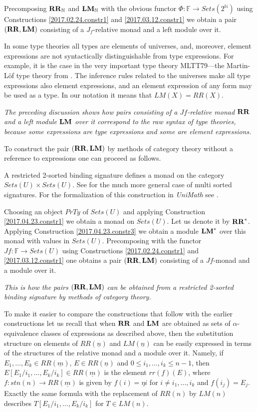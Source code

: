 \documentclass[12pt]{amsart}
\numberwithin{proposition}{subsection}
\newcommand{\sr}{\rightarrow}
\newcommand{\nn}{{\mathbb N}}
\newcommand{\nat}{\nn}
\newcommand{\uu}{\underline}
\newcommand{\RR}{{\bf RR}}
\newcommand{\LM}{{\bf LM}}
\newcommand{\FF}{{\mathbb F}}
\newcommand{\ff}[1]{\uu{#1}}
\begin{document}
Precomposing $\RR_{\nat}$ and $\LM_{\nat}$ with the obvious functor
$\Phi:\FF\sr Sets(2^{\nat})$ using Constructions \ref{2017.02.24.constr1} and
\ref{2017.03.12.constr1} we obtain a pair $(\RR,\LM)$ consisting of a $J_f$-relative monad
and a left module over it.

In some type theories all types are elements of universes, and, moreover, element
expressions are not syntactically distinguishable from type expressions. For
example, it is the case in the very important type theory MLTT79---the
Martin-L\"{o}f type theory from \cite{MLTT79}. The inference rules related to
the universes \cite[p.~172]{MLTT79} make all type expressions also element
expressions, and an element expression of any form may be used as a type. In our
notation it means that $LM(X)=RR(X)$.

{\em The preceding discussion shows how pairs consisting of a $Jf$-relative monad $\RR$
  and a left module $\LM$ over it correspond to the raw syntax of type theories,
  because some expressions are type expressions and some are element
  expressions.}

To construct the pair $(\RR,\LM)$ by methods of category theory without a
reference to expressions one can proceed as follows.

A restricted 2-sorted binding signature defines a monad on the category
$Sets(U)\times Sets(U)$. See \cite{Zsido} for the much more general case of multi
sorted signatures. For the formalization of this construction in {\em UniMath} see
\cite{AMM2017}.

Choosing an object $PrTy$ of $Sets(U)$ and applying Construction
\ref{2017.04.23.constr1} we obtain a monad on $Sets(U)$. Let us denote it by
$\RR^*$. Applying Construction \ref{2017.04.23.constr3} we obtain a module
$\LM^*$ over this monad with values in $Sets(U)$.  Precomposing with the
functor $Jf:\FF\sr Sets(U)$ using Constructions \ref{2017.02.24.constr1} and
\ref{2017.03.12.constr1} one obtains a pair $(\RR,\LM)$ consisting of a $Jf$-monad and a
module over it.

{\em This is how the pairs $(\RR,\LM)$ can be obtained from a restricted
  2-sorted binding signature by methods of category theory.}

To make it easier to compare the constructions that follow with the earlier
constructions let us recall that when $\RR$ and $\LM$ are obtained as sets
of $\alpha$-equivalence classes of expressions as described above, then the
substitution structure on elements of $RR(\ff{n})$ and $LM(\ff{n})$ can be
easily expressed in terms of the structures of the relative monad and a module
over it.  Namely, if $E_1,\dots,E_k\in RR(\ff{m})$, 
$E\in RR(\ff{n})$ and $0\le i_1,\dots,i_k\le n-1$, then 
$E[E_1/i_1,\dots,E_k/i_k]\in RR(\ff{m})$ is the element $rr(f)(E)$, where $f:stn(n)\sr RR(\ff{m})$ is given
by $f(i)=\eta{i}$ for $i\ne i_1,\dots,i_k$ and $f(i_j)=E_j$. Exactly the same
formula with the replacement of $RR(n)$ by $LM(n)$ describes
$T[E_1/i_1,\dots,E_k/i_k]$ for $T\in LM(n)$.
\end{document}
